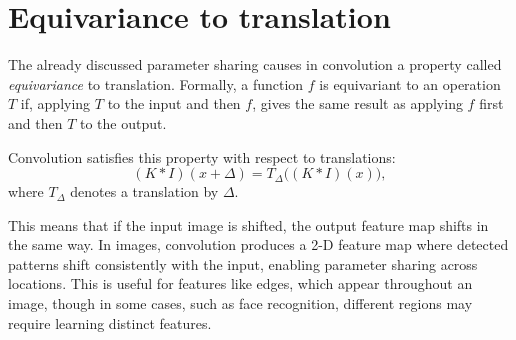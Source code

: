 \section{Equivariance to translation}

The already discussed parameter sharing causes in convolution a property called \textit{equivariance} to translation.  
Formally, a function $f$ is equivariant to an operation $T$ if, applying $T$ to the input and then $f$, gives the same result as applying $f$ first and then $T$ to the output.  

Convolution satisfies this property with respect to translations:  
\[
(K * I)(x + \Delta) = T_{\Delta} \big( (K * I)(x) \big),
\]
where $T_{\Delta}$ denotes a translation by $\Delta$.  

This means that if the input image is shifted, the output feature map shifts in the same way. In images, convolution produces a 2-D feature map where detected patterns shift consistently with the input, enabling parameter sharing across locations. This is useful for features like edges, which appear throughout an image, though in some cases, such as face recognition, different regions may require learning distinct features. 
